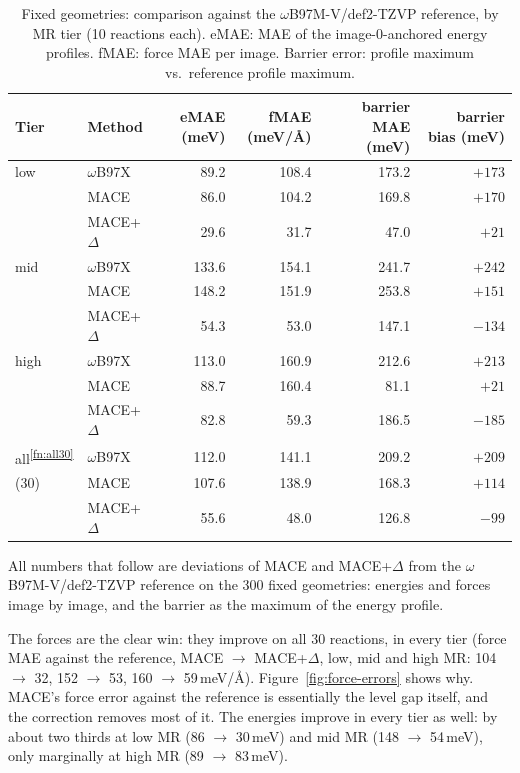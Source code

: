 \begin{table}[H]
  \centering
  \caption{Fixed geometries: comparison against the
  $\omega$B97M-V/def2-TZVP reference, by MR tier (10 reactions each). eMAE: MAE of
  the image-0-anchored energy profiles. fMAE: force MAE per image. Barrier
  error: profile maximum vs.\ reference profile maximum.}
  \label{tab:delta-sp-results}
  \begin{tabular}{llrrrr}
    \toprule
    Tier & Method & eMAE (meV) & fMAE (meV/\AA) & barrier MAE (meV) & barrier bias (meV) \\
    \midrule
    low  & $\omega$B97X      &  89.2 & 108.4 & 173.2 & $+173$ \\
         & MACE          &  86.0 & 104.2 & 169.8 & $+170$ \\
         & MACE+$\Delta$ &  29.6 &  31.7 &  47.0 & $+21$ \\
    \midrule
    mid  & $\omega$B97X      & 133.6 & 154.1 & 241.7 & $+242$ \\
         & MACE          & 148.2 & 151.9 & 253.8 & $+151$ \\
         & MACE+$\Delta$ &  54.3 &  53.0 & 147.1 & $-134$ \\
    \midrule
    high & $\omega$B97X      & 113.0 & 160.9 & 212.6 & $+213$ \\
         & MACE          &  88.7 & 160.4 &  81.1 & $+21$ \\
         & MACE+$\Delta$ &  82.8 &  59.3 & 186.5 & $-185$ \\
    \midrule
    all\textsuperscript{\ref{fn:all30}}  & $\omega$B97X      & 112.0 & 141.1 & 209.2 & $+209$ \\
    (30) & MACE          & 107.6 & 138.9 & 168.3 & $+114$ \\
         & MACE+$\Delta$ &  55.6 &  48.0 & 126.8 & $-99$ \\
    \bottomrule
  \end{tabular}
\end{table}

All numbers that follow are deviations of MACE and MACE+$\Delta$ from
the $\omega$B97M-V/def2-TZVP reference on the 300 fixed geometries:
energies and forces image by image, and the barrier as the maximum of
the energy profile.

The forces are the clear win: they improve on all 30 reactions, in every
tier (force MAE against the reference, MACE $\rightarrow$ MACE+$\Delta$,
low, mid and high MR: 104 $\rightarrow$ 32, 152 $\rightarrow$ 53,
160 $\rightarrow$ 59\,meV/\AA). Figure~\ref{fig:force-errors} shows why. MACE's force error
against the reference is essentially the level gap itself, and the
correction removes most of it. The energies improve in every tier as well:
by about two thirds at low MR (86 $\rightarrow$ 30\,meV) and mid MR
(148 $\rightarrow$ 54\,meV), only marginally at high
MR (89 $\rightarrow$ 83\,meV).

